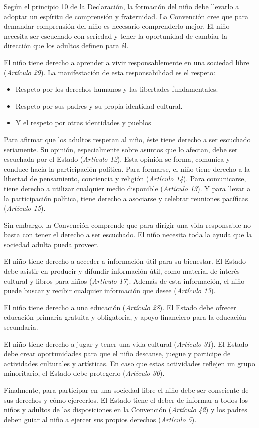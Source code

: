 \documentclass{tufte-handout}
\begin{document}

Según el principio 10 de la Declaración, la formación del niño debe llevarlo a adoptar un espíritu de comprensión y fraternidad. La Convención cree que para demandar comprensión del niño es necesario comprenderlo mejor. El niño necesita ser escuchado con seriedad y tener la oportunidad de cambiar la dirección que los adultos definen para él.

El niño tiene derecho a aprender a vivir responsablemente en una sociedad libre (\textit{Artículo 29}). La manifestación de esta responsabilidad es el respeto:

\begin{itemize}
\item{Respeto por los derechos humanos y las libertades fundamentales.}
\item{Respeto por sus padres y su propia identidad cultural.}
\item{Y el respeto por otras identidades y pueblos}
\end{itemize}

Para afirmar que los adultos respetan al niño, éste tiene derecho a ser escuchado seriamente. Su opinión, especialmente sobre asuntos que lo afectan, debe ser escuchada por el Estado (\textit{Artículo 12}). Esta opinión se forma, comunica y conduce hacia la participación política. Para formarse, el niño tiene derecho a la libertad de pensamiento, conciencia y religión (\textit{Artículo 14}). Para comunicarse, tiene derecho a utilizar cualquier medio disponible (\textit{Artículo 13}). Y para llevar a la participación política, tiene derecho a asociarse y celebrar reuniones pacíficas (\textit{Artículo 15}).

Sin embargo, la Convención comprende que para dirigir una vida responsable no basta con tener el derecho a ser escuchado. El niño necesita toda la ayuda que la sociedad adulta pueda proveer.

El niño tiene derecho a acceder a información útil para su bienestar. El Estado debe asistir en producir y difundir información útil, como material de interés cultural y libros para niños (\textit{Artículo 17}). Además de esta información, el niño puede buscar y recibir cualquier información que desee (\textit{Artículo 13}).

El niño tiene derecho a una educación (\textit{Artículo 28}). El Estado debe ofrecer educación primaria gratuita y obligatoria, y apoyo financiero para la educación secundaria. 

El niño tiene derecho a jugar y tener una vida cultural (\textit{Artículo 31}). El Estado debe crear oportunidades para que el niño descanse, juegue y participe de actividades culturales y artísticas. En caso que estas actividades reflejen un grupo minoritario, el Estado debe protegerlo (\textit{Artículo 30}).

Finalmente, para participar en una sociedad libre el niño debe ser consciente de sus derechos y cómo ejercerlos. El Estado tiene el deber de informar a todos los niños y adultos de las disposiciones en la Convención (\textit{Artículo 42}) y los padres deben guiar al niño a ejercer sus propios derechos (\textit{Artículo 5}).
\end{document}
